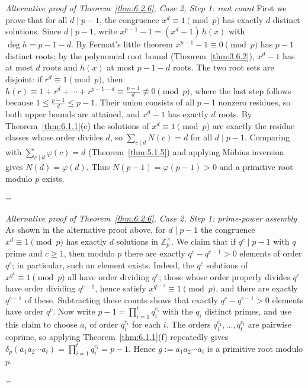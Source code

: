 \documentclass[11pt]{article}
\makeatletter
\let\nt@closedisplay\]
\def\nt@guardedclose{\@ifnextchar\par{\nt@closeafterpar}{\@ifnextchar\end{\postdisplaypenalty\@M\nt@closedisplay}{\nt@closedisplay}}}
\def\nt@closeafterpar\par{\@ifnextchar\par{\nt@closeafterpar}{\@ifnextchar\end{\postdisplaypenalty\@M\nt@closedisplay\par}{\nt@closedisplay\par}}}
\renewenvironment{proof}[1][\proofname]{\par
  \pushQED{\qed}\normalfont\topsep\medskipamount\edef\nt@afterproof{\@endparpenalty=\the\@endparpenalty\relax}\@beginparpenalty\@M\@endparpenalty\@M\let\]\nt@guardedclose\trivlist\item[]\textit{#1\@addpunct{.}} \ignorespaces}{\ifvmode\addpenalty\@M\fi\popQED\nt@afterproof\endtrivlist\@endpefalse}
\theoremstyle{ntstyle}
\newenvironment{altproof}[1][\proofname]
  {\begin{proof}[#1]\renewcommand{\qedsymbol}{}}{\end{proof}}
\newcommand{\ZmodUnits}[1]{\mathbb{Z}_{#1}^{\times}}
\makeatother
\begin{document}
\begin{altproof}[Alternative proof of Theorem~\ref{thm:6.2.6}, Case 2, Step 1: root count]
  First we prove that for all $d \mid p-1$, the congruence $x^{d} \equiv 1 \pmod{p}$ has exactly $d$ distinct
  solutions. Since $d \mid p-1$, write $x^{p-1} - 1 = (x^{d} - 1)\,h(x)$ with $\deg h = p - 1 - d$. By Fermat's
  little theorem $x^{p-1} - 1 \equiv 0 \pmod{p}$ has
  $p-1$ distinct roots; by the polynomial root bound
  (Theorem~\ref{thm:3.6.2}), $x^{d} - 1$ has at most $d$ roots
  and $h(x)$ at most $p-1-d$ roots. The two root sets are disjoint: if $r^{d}\equiv1\pmod{p}$, then
  $h(r)\equiv1+r^{d}+\cdots+r^{p-1-d}\equiv\tfrac{p-1}{d}\not\equiv0\pmod{p}$, where the last step follows because
  $1\le\tfrac{p-1}{d}\le p-1$. Their union consists of all $p-1$ nonzero residues, so both upper bounds are
  attained, and $x^d-1$ has exactly $d$ roots. By Theorem~\ref{thm:6.1.1}(c) the solutions of
  $x^{d}\equiv1\pmod{p}$ are exactly the residue classes whose order divides $d$, so $\sum_{c \mid d} N(c) = d$
  for all $d \mid p-1$. Comparing with $\sum_{c \mid d} \varphi(c) = d$ (Theorem~\ref{thm:5.1.5})
  and applying Möbius inversion gives $N(d) = \varphi(d)$. Thus
  $N(p-1) = \varphi(p-1) > 0$ and a primitive root modulo $p$ exists.

\end{altproof}

\begin{altproof}[Alternative proof of Theorem~\ref{thm:6.2.6}, Case 2, Step 1: prime-power assembly]
  As shown in the alternative proof above, for $d \mid p-1$ the congruence $x^{d} \equiv 1 \pmod{p}$ has exactly
  $d$ solutions in
  $\ZmodUnits{p}$. We claim that if $q^{c} \mid p-1$ with $q$ prime
  and $c \ge 1$, then modulo $p$ there are exactly $q^{c} - q^{c-1} > 0$ elements of order $q^{c}$; in particular,
  such an element exists.
  Indeed, the $q^{c}$ solutions of $x^{q^{c}} \equiv 1 \pmod{p}$ all
  have order dividing $q^{c}$; those whose order properly divides
  $q^{c}$ have order dividing $q^{c-1}$, hence satisfy $x^{q^{c-1}} \equiv 1 \pmod{p}$, and there are exactly
  $q^{c-1}$ of these.
  Subtracting these counts shows that exactly $q^{c} - q^{c-1} > 0$ elements have order
  $q^{c}$. Now write $p-1 = \prod_{i=1}^{t} q_i^{c_i}$ with the $q_i$
  distinct primes, and use this claim to choose $a_i$ of order
  $q_i^{c_i}$ for each $i$. The orders $q_1^{c_1}, \ldots, q_t^{c_t}$
  are pairwise coprime, so applying Theorem~\ref{thm:6.1.1}(f) repeatedly gives
  $\delta_p(a_1 a_2 \cdots a_t) = \prod_{i=1}^{t} q_i^{c_i} = p-1$.
  Hence $g := a_1 a_2 \cdots a_t$ is a primitive root modulo $p$.

\end{altproof}
\end{document}
